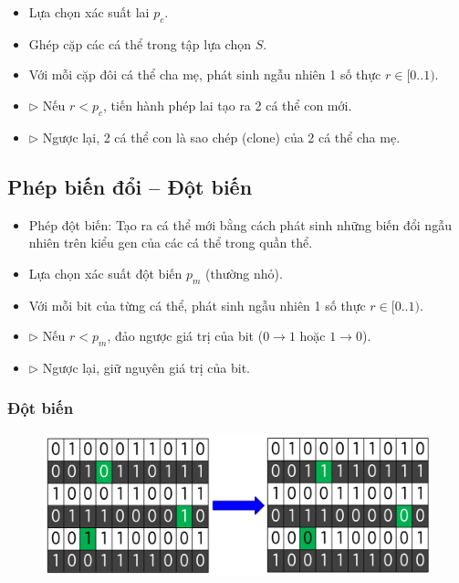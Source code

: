 \documentclass{book}
\begin{document}
\begin{itemize}
    \item Lựa chọn xác suất lai $p_c$.
    \item Ghép cặp các cá thể trong tập lựa chọn $S$.
    \item Với mỗi cặp đôi cá thể cha mẹ, phát sinh ngẫu nhiên 1 số thực $r \in [0..1)$.
    \item[] $\triangleright$ Nếu $r < p_c$, tiến hành phép lai tạo ra 2 cá thể con mới.
    \item[] $\triangleright$ Ngược lại, 2 cá thể con là sao chép (clone) của 2 cá thể cha mẹ.
\end{itemize}

\subsection{Phép biến đổi – Đột biến} %
\begin{itemize}
    \item Phép đột biến: Tạo ra cá thể mới bằng cách phát sinh những biến đổi ngẫu nhiên trên kiểu gen của các cá thể trong quần thể.
    \item Lựa chọn xác suất đột biến $p_m$ (thường nhỏ).
    \item Với mỗi bit của từng cá thể, phát sinh ngẫu nhiên 1 số thực $r \in [0..1)$.
    \item[] $\triangleright$ Nếu $r < p_m$, đảo ngược giá trị của bit ($0 \rightarrow 1$ hoặc $1 \rightarrow 0$).
    \item[] $\triangleright$ Ngược lại, giữ nguyên giá trị của bit.
\end{itemize}

\subsubsection{Đột biến}
\begin{figure}[H]
    \centering
    \includegraphics[width=0.75\linewidth]{images/dotbien.png}
\end{figure}
\end{document}
